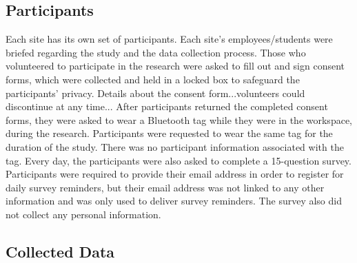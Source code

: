 \documentclass[acmtog]{acmart}
\begin{document}
\subsection{Participants}
Each site has its own set of participants. Each site's employees/students were briefed regarding the study and the data collection process. Those who volunteered to participate in the research were asked to fill out and sign consent forms, which were collected and held in a locked box to safeguard the participants' privacy. Details about the consent form...volunteers could discontinue at any time... After participants returned the completed consent forms, they were asked to wear a Bluetooth tag while they were in the workspace, during the research. Participants were requested to wear the same tag for the duration of the study. There was no participant information associated with the tag. Every day, the participants were also asked to complete a 15-question survey. Participants were required to provide their email address in order to register for daily survey reminders, but their email address was not linked to any other information and was only used to deliver survey reminders. The survey also did not collect any personal information.

\subsection{Collected Data}
\end{document}
